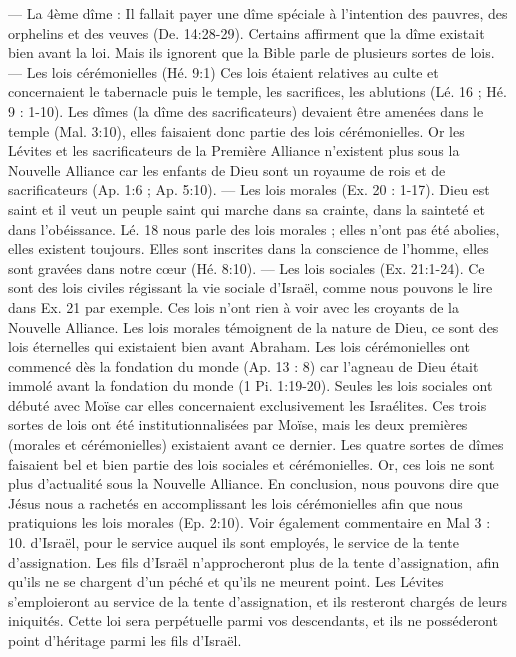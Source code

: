 \begin{multicols}{2}
{— La 4ème dîme : Il fallait payer une dîme spéciale à l’intention des pauvres, des orphelins et des veuves (De. 14:28-29). 
Certains affirment que la dîme existait bien avant la loi. Mais ils ignorent que la Bible parle de plusieurs sortes de lois.
— Les lois cérémonielles (Hé. 9:1)
Ces lois étaient relatives au culte et concernaient le tabernacle puis le temple,  les sacrifices, les ablutions (Lé. 16 ; Hé. 9 : 1-10). Les dîmes (la dîme des sacrificateurs) devaient être amenées dans le temple (Mal. 3:10), elles faisaient donc partie des lois cérémonielles. Or les Lévites et les sacrificateurs de la Première Alliance n’existent plus sous la Nouvelle Alliance car les enfants de Dieu sont un royaume de rois et de sacrificateurs (Ap. 1:6 ; Ap. 5:10).
— Les lois morales (Ex. 20 : 1-17). Dieu est saint et il veut un peuple saint qui marche dans sa crainte, dans la sainteté et dans l’obéissance. Lé. 18 nous parle des lois morales ; elles n’ont pas été abolies, elles existent toujours. Elles sont inscrites dans la conscience de l’homme, elles sont gravées dans notre cœur (Hé. 8:10).
— Les lois sociales (Ex. 21:1-24). Ce sont des lois civiles régissant la vie sociale d’Israël, comme nous pouvons le lire dans Ex. 21 par exemple. Ces lois n’ont rien à voir avec les croyants de la Nouvelle Alliance. Les lois morales témoignent de la nature de Dieu, ce sont des lois éternelles qui existaient bien avant Abraham. Les lois cérémonielles ont commencé dès la fondation du monde (Ap. 13 : 8) car l’agneau de Dieu était immolé avant la fondation du monde (1 Pi. 1:19-20). Seules les lois sociales ont débuté avec Moïse car elles concernaient exclusivement les Israélites. Ces trois sortes de lois ont été institutionnalisées par Moïse, mais les deux premières (morales et cérémonielles) existaient avant ce dernier. Les quatre sortes de dîmes faisaient bel et bien partie des lois sociales et cérémonielles. Or, ces lois ne sont plus d’actualité sous la Nouvelle Alliance. En conclusion, nous pouvons dire que Jésus nous a rachetés en accomplissant les lois cérémonielles afin que nous pratiquions les lois morales (Ep. 2:10). Voir  également commentaire en Mal 3 : 10.} d'Israël, pour le service auquel ils sont employés, le service de la tente d'assignation.
Les fils d'Israël n'approcheront plus de la tente d'assignation, afin qu'ils ne se chargent d’un péché et qu'ils ne meurent point.
Les Lévites s'emploieront au service de la tente d'assignation, et ils resteront chargés de leurs iniquités. Cette loi sera perpétuelle parmi vos descendants, et ils ne posséderont point d'héritage parmi les fils d'Israël.

\end{multicols}
